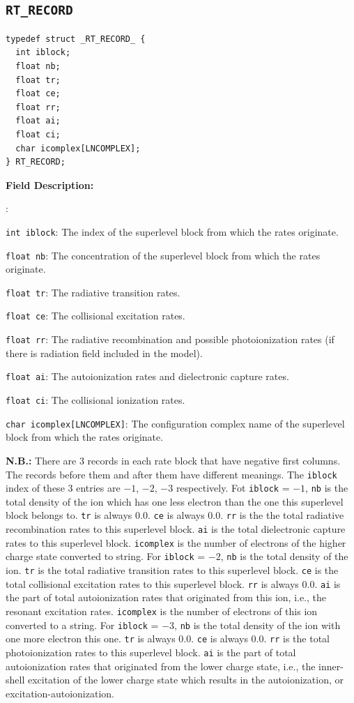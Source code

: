 \documentclass[twoside,letterpaper]{refrep}
\newenvironment{dbdesc}{\textbf{Field Description:} \begin{list}
	{:}{\setlength{\labelwidth}{2in}
	   \setlength{\leftmargin}{2in}
	   \setlength{\labelsep}{0.1in}
	   \setlength{\rightmargin}{0.2in}}}
	{\end{list}}
\begin{document}
\subsection{\texttt{RT\_RECORD}}
\begin{verbatim}
typedef struct _RT_RECORD_ {
  int iblock;
  float nb;
  float tr;
  float ce;
  float rr;
  float ai;
  float ci;
  char icomplex[LNCOMPLEX];
} RT_RECORD;
\end{verbatim}

\begin{dbdesc}
\item[\texttt{int iblock}:] The index of the superlevel block from which the
rates originate.
\item[\texttt{float nb}:] The concentration of the superlevel block from which
the rates originate.
\item[\texttt{float tr}:] The radiative transition rates.
\item[\texttt{float ce}:] The collisional excitation rates.
\item[\texttt{float rr}:] The radiative recombination and possible
photoionization rates (if there is radiation field included in the model).
\item[\texttt{float ai}:] The autoionization rates and dielectronic capture
rates. 
\item[\texttt{float ci}:] The collisional ionization rates. 
\item[\texttt{char icomplex[LNCOMPLEX]}:] The configuration complex name of
the superlevel block from which the rates originate.
\end{dbdesc}

\textbf{N.B.:} There are 3 records in each rate block that have negative first
columns. The records before them and after them have different meanings. The
\texttt{iblock} index of these 3 entries are $-1$, $-2$, $-3$ 
respectively. Fot \texttt{iblock} = $-1$, \texttt{nb} is the total density of
the ion which has one less electron than the one this superlevel block belongs
to. \texttt{tr} is always 0.0. \texttt{ce} is always 0.0. \texttt{rr} is the
the total radiative recombination rates to this superlevel block. \texttt{ai}
is the total dielectronic capture rates to this superlevel
block. \texttt{icomplex} is the number of electrons of the higher charge state
converted to string. For \texttt{iblock} = $-2$, \texttt{nb} is the total
density of the ion. \texttt{tr} is the total radiative transition rates to
this superlevel block. \texttt{ce} is the total collisional excitation rates
to this superlevel block. \texttt{rr} is always 0.0. \texttt{ai} is the part
of total autoionization rates that originated from this ion, i.e., the
resonant excitation rates. \texttt{icomplex} is the number of electrons of
this ion converted to a string. For \texttt{iblock} = $-3$, \texttt{nb} is the
total density of the ion with one more electron this one. \texttt{tr} is
always 0.0. \texttt{ce} is always 0.0. \texttt{rr} is the total
photoionization rates to this superlevel block. \texttt{ai} is the part of
total autoionization rates that originated from the lower charge state, i.e.,
the inner-shell excitation of the lower charge state which results in the
autoionization, or excitation-autoionization.
\end{document}
